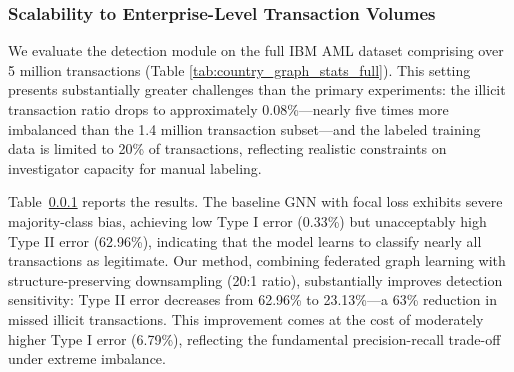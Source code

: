 \begin{table}[h!]
\centering
\caption{Statistics of transaction by country}
\label{tab:country_graph_stats_full}
\end{table}

\subsubsection{Scalability to Enterprise-Level Transaction Volumes}
\label{scalability_analysis}
We evaluate the detection module on the full IBM AML dataset comprising over 5 million transactions (Table \ref{tab:country_graph_stats_full}). This setting presents substantially greater challenges than the primary experiments: the illicit transaction ratio drops to approximately 0.08\%—nearly five times more imbalanced than the 1.4 million transaction subset—and the labeled training data is limited to 20\% of transactions, reflecting realistic constraints on investigator capacity for manual labeling.

Table~\ref{scalability_analysis} reports the results. The baseline GNN with focal loss exhibits severe majority-class bias, achieving low Type I error (0.33\%) but unacceptably high Type II error (62.96\%), indicating that the model learns to classify nearly all transactions as legitimate. Our method, combining federated graph learning with structure-preserving downsampling (20:1 ratio), substantially improves detection sensitivity: Type II error decreases from 62.96\% to 23.13\%—a 63\% reduction in missed illicit transactions. This improvement comes at the cost of moderately higher Type I error (6.79\%), reflecting the fundamental precision-recall trade-off under extreme imbalance.


